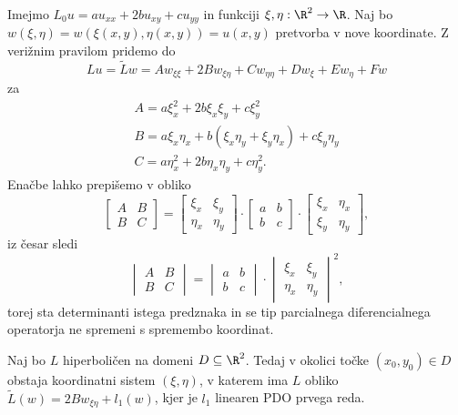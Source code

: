 Imejmo $L_0 u = a u_{xx} + 2b u_{xy} + c u_{yy}$ in funkciji $\xi, \eta : \R^2
\to \R$.
Naj bo $w(\xi, \eta) = w(\xi(x,y), \eta(x,y)) = u(x,y)$ pretvorba v nove
koordinate.
Z verižnim pravilom pridemo do
\[
  Lu = \tilde{L} w
  = A w_{\xi \xi} + 2B w_{\xi \eta} + C w_{\eta \eta} + D w_{\xi} + E w_{\eta} + Fw
\]
za
\begin{gather*}
  A = a \xi_x^2 + 2b \xi_x \xi_y + c \xi_y^2 \\
  B = a \xi_x \eta_x + b (\xi_x \eta_y + \xi_y \eta_x) + c \xi_y \eta_y \\
  C = a \eta_x^2 + 2b \eta_x \eta_y + c \eta_y^2.
\end{gather*}
Enačbe lahko prepišemo v obliko
\[
  \begin{bmatrix}
	A & B \\
	B & C
  \end{bmatrix}
  =
  \begin{bmatrix}
	\xi_x & \xi_y \\
	\eta_x & \eta_y
  \end{bmatrix}
  \cdot
  \begin{bmatrix}
	a & b \\
	b & c
  \end{bmatrix}
  \cdot
  \begin{bmatrix}
	\xi_x & \eta_x \\
	\xi_y & \eta_y
  \end{bmatrix},
\]
iz česar sledi
\[
  \begin{vmatrix}
	A & B \\
	B & C
  \end{vmatrix}
  =
  \begin{vmatrix}
	a & b \\
	b & c
  \end{vmatrix}
  \cdot
  {
  \begin{vmatrix}
	\xi_x & \xi_y \\
	\eta_x & \eta_y
  \end{vmatrix}
  }^2,
\]
torej sta determinanti istega predznaka in se tip parcialnega diferencialnega
operatorja ne spremeni s spremembo koordinat.

\begin{izrek}
  Naj bo $L$ hiperboličen na domeni $D \subseteq \R^2$.
  Tedaj v okolici točke $(x_0, y_0) \in D$ obstaja koordinatni sistem $(\xi,
  \eta)$, v katerem ima $L$ obliko $\tilde{L}(w) = 2B w_{\xi \eta} + l_1(w)$,
  kjer je $l_1$ linearen PDO prvega reda.
\end{izrek}

